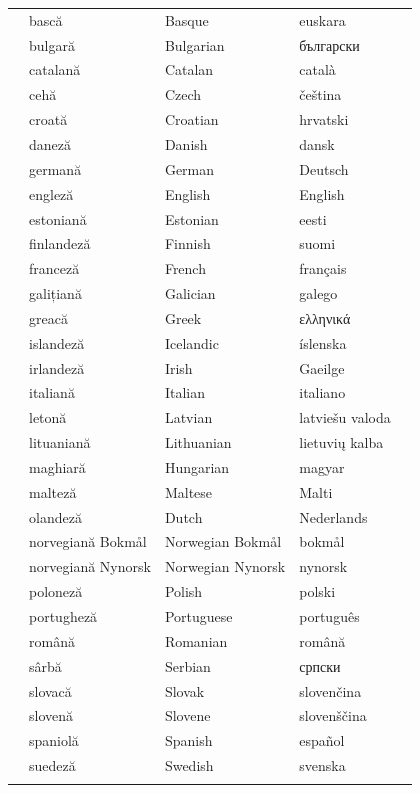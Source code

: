 \cleardoublepage

\label{whitepaperseries}

\vspace*{-5mm}
\centering
  \setlength{\tabcolsep}{2em}
  \begin{tabularx}{\textwidth}{lllll} \toprule\addlinespace
&bască & Basque & euskara&\\
&bulgară & Bulgarian & български&\\
&catalană & Catalan & català&\\
&cehă & Czech & čeština&\\
&croată & Croatian & hrvatski&\\
&daneză & Danish & dansk&\\
&germană & German & Deutsch&\\
&engleză & English & English&\\
&estoniană & Estonian & eesti&\\
&finlandeză & Finnish & suomi&\\
&franceză & French & français&\\
&galițiană & Galician & galego&\\
&greacă & Greek & ελληνικά&\\
&islandeză & Icelandic & íslenska&\\
&irlandeză & Irish & Gaeilge&\\
&italiană & Italian & italiano&\\
&letonă & Latvian & latviešu valoda&\\
&lituaniană & Lithuanian & lietuvių kalba&\\
&maghiară & Hungarian & magyar&\\ 
&malteză & Maltese & Malti&\\
&olandeză & Dutch & Nederlands&\\
&norvegiană Bokmål & Norwegian Bokmål & bokmål&\\
&norvegiană Nynorsk & Norwegian Nynorsk & nynorsk&\\
&poloneză & Polish & polski&\\
&portugheză & Portuguese & português&\\
&română & Romanian & română&\\
&sârbă & Serbian & српски&\\
&slovacă & Slovak & slovenčina&\\
&slovenă & Slovene & slovenščina&\\
&spaniolă & Spanish & español&\\
&suedeză & Swedish & svenska&\\
 \addlinespace \bottomrule
\end{tabularx}
